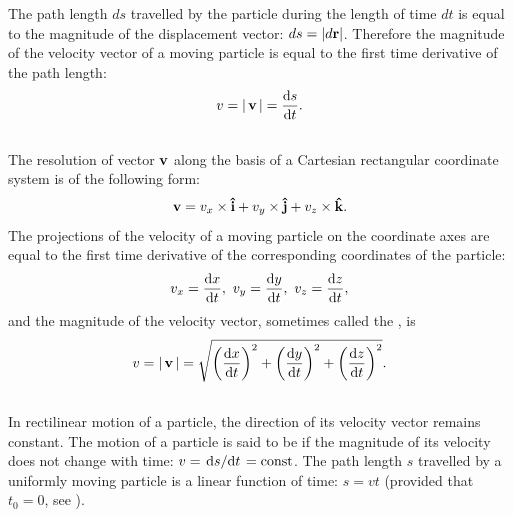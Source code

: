 The path length $ds$ travelled by the particle during the length of time $dt$ is equal to the magnitude of the displacement vector: $ds = \abs{d\vb{r}}$. Therefore the magnitude of the velocity vector of a moving particle is equal to the first time derivative of the path length:
\begin{equation*}%
v = \abs{\,\vb{v}\,} = \dv{s}{t}.
\end{equation*}

\subsection{}\label{1.3.3} The resolution of vector $\vb{v}$ along the basis of a Cartesian rectangular coordinate system is of the following form:
\begin{equation*}%
\vb{v} = v_{x} \times \vu{i} + v_{y} \times \vu{j} +v_{z} \times \vu{k}.
\end{equation*}
The projections of the velocity of a moving particle on the coor­dinate axes are equal to the first time derivative of the corres­ponding coordinates of the particle:
\begin{equation*}%
v_{x}= \dv{x}{t}, \,\, v_{y}= \dv{y}{t}, \,\, v_{z}= \dv{z}{t},
\end{equation*}
and the magnitude of the velocity vector, sometimes called the , is
\begin{equation*}%
v = \abs{\,\vb{v}\,} = \sqrt{\left( \dv{x}{t} \right)^{2} + \left(\dv{y}{t}\right)^{2} + \left(\dv{z}{t}\right)^{2}}.
\end{equation*}

\subsection{}\label{1.3.4} In rectilinear motion of a particle, the direction of its velocity vector remains constant. The motion of a particle is said to be  if the magnitude of its velocity does not change with time: $v = \dv*{s}{t} = \text{const}$. The path length $s$ tra­velled by a uniformly moving particle is a linear function of time: $s = vt$ (provided that $t_{0}= 0$, see ).

